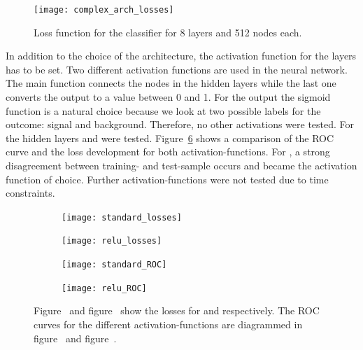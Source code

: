 \begin{figure}[htbp]
	\centering
	\texttt{[image: complex\_arch\_losses]}
	\caption[Classifier losses for a complex architecture]{Loss function for the classifier for \num{8} layers and \num{512} nodes each.}
	\label{fig:complex_arch}
\end{figure}

In addition to the choice of the architecture, the activation function for the layers has to be set.
Two different activation functions are used in the neural network. The main function connects the nodes in the hidden layers while the last one converts the output to a value between \num{0} and \num{1}. For the output the sigmoid function is a natural choice because we look at two possible labels for the outcome: signal and background. Therefore, no other activations were tested.
For the hidden layers \ELU and \RELU were tested. Figure~\ref{fig:activ} shows a comparison of the ROC curve and the loss development for both activation-functions. For \RELU, a strong disagreement between training- and test-sample occurs and \ELU became the activation function of choice. Further activation-functions were not tested due to time constraints.

\begin{figure}[htbp]
    \centering
    \begin{subfigure}[b]{0.48\textwidth}
        \texttt{[image: standard\_losses]}
        \caption{}
        \label{fig:activ:standard:loss}
    \end{subfigure}
\quad
    \begin{subfigure}[b]{0.48\textwidth}
        \texttt{[image: relu\_losses]}
        \caption{}
        \label{fig:activ:relu:loss}
    \end{subfigure}

    \begin{subfigure}[b]{0.48\textwidth}
		\texttt{[image: standard\_ROC]}
		\caption{}
		\label{fig:activ:standard:roc}
	\end{subfigure}
\quad
	\begin{subfigure}[b]{0.48\textwidth}
		\texttt{[image: relu\_ROC]}
		\caption{}
		\label{fig:activ:relu:roc}
	\end{subfigure}
    \caption[Classifier performance for different activation functions]{Figure~ and figure~ show the losses for \ELU and \RELU respectively. The ROC curves for the different activation-functions are diagrammed in figure~ and figure~.}
	\label{fig:activ}
\end{figure}


